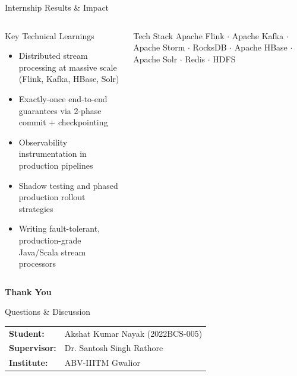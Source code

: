 \documentclass[aspectratio=169,xcolor=dvipsnames,10pt]{beamer}
\begin{document}
\begin{frame}{Internship Results \& Impact}
\begin{columns}[T]
        \begin{block}{Key Technical Learnings}
            \footnotesize
            \begin{itemize}
                \item Distributed stream processing at massive scale (Flink, Kafka, HBase, Solr)
                \item Exactly-once end-to-end guarantees via 2-phase commit + checkpointing
                \item Observability instrumentation in production pipelines
                \item Shadow testing and phased production rollout strategies
                \item Writing fault-tolerant, production-grade Java/Scala stream processors
            \end{itemize}
        \end{block}

        \vspace{0.3em}
        \begin{alertblock}{Tech Stack}
            \scriptsize
            Apache Flink $\cdot$ Apache Kafka $\cdot$ Apache Storm $\cdot$ RocksDB $\cdot$ Apache HBase $\cdot$ Apache Solr $\cdot$ Redis $\cdot$ HDFS
        \end{alertblock}
    \end{columns}
\end{frame}

\begin{frame}
    \vspace{1.5em}
    \Huge{\centerline{\textbf{Thank You}}}
    \vspace{1em}
    \large{\centerline{Questions \& Discussion}}
    \vspace{2em}
    \normalsize
    \centering
    \begin{tabular}{ll}
        \textbf{Student:}    & Akshat Kumar Nayak (2022BCS-005) \\
        \textbf{Supervisor:} & Dr. Santosh Singh Rathore \\
        \textbf{Institute:}  & ABV-IIITM Gwalior \\
    \end{tabular}
\end{frame}
\end{document}
